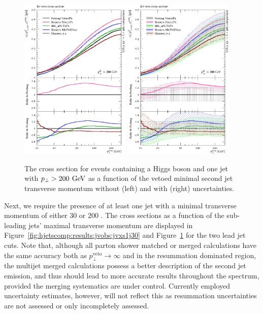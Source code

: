 {\begin{figure}[t!]
  \centering
  \includegraphics[width=0.47\textwidth]{figures/hjetscomp_u_xs_jet_veto_j1_200.pdf}
  \hfill
  \includegraphics[width=0.47\textwidth]{figures/hjetscomp_xs_jet_veto_j1_200.pdf}
  \caption{
    The cross section for events containing a Higgs boson 
    and one jet with $p_\perp>200\,\text{\:GeV}$ as a function of
    the vetoed minimal second jet transverse momentum without
    (left) and with (right) uncertainties.
    \label{fig:hjetscomp:results:jvobs:jvxs1j200}
  }
\end{figure}

Next, we require the presence of at least one jet with 
a minimal transverse momentum of either $30$ or $200$ \gev. 
The cross sections as a function of 
the sub-leading jets’ maximal transverse momentum are displayed in 
Figure~\ref{fig:hjetscomp:results:jvobs:jvxs1j30} and 
Figure~\ref{fig:hjetscomp:results:jvobs:jvxs1j200} for the two lead jet cuts. 
Note that, although all parton 
shower matched or merged calculations have the same accuracy both as 
$p_\perp^\text{veto}\to\infty$ and in the resummation dominated region, 
the multijet merged calculations possess a better description of the 
second jet emission, and thus should lead to more accurate results 
throughout the spectrum, provided the merging systematics are under control. 
Currently employed uncertainty estimates, however, will not reflect this 
as resummation uncertainties are not assessed or only incompletely assessed.

}

